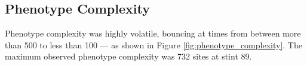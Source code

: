 \clearpage
\onecolumn



\clearpage
\twocolumn

\subsection{Phenotype Complexity}



Phenotype complexity was highly volatile, bouncing at times from between more than 500 to less than 100 --- as shown in Figure \ref{fig:phenotype_complexity}.
The maximum observed phenotype complexity was 732 sites at stint 89.
















\clearpage
\onecolumn



\twocolumn









